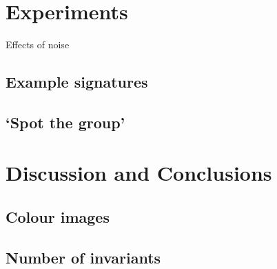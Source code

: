 \documentclass{article}
\begin{document}
\section{Experiments}
Effects of noise
\subsection{Example signatures}
\subsection{`Spot the group'}

\section{Discussion and Conclusions}
\subsection{Colour images}
\subsection{Number of invariants}
\end{document}
